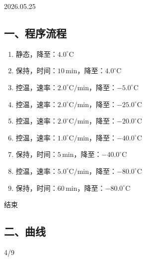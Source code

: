 \documentclass[UTF8,10pt,a4paper,fontset=fandol]{ctexart}
\newcommand{\handwritten}[1]{#1}
\begin{document}
\handwritten{2026.05.25}

\subsection*{一、程序流程}

\begin{enumerate}
    \item 静态，降至：$4.0^\circ\mathrm{C}$
    \item 保持，时间：$10\,\mathrm{min}$，降至：$4.0^\circ\mathrm{C}$
    \item 控温，速率：$2.0^\circ\mathrm{C}/\mathrm{min}$，降至：$-5.0^\circ\mathrm{C}$
    \item 控温，速率：$2.0^\circ\mathrm{C}/\mathrm{min}$，降至：$-25.0^\circ\mathrm{C}$
    \item 控温，速率：$2.0^\circ\mathrm{C}/\mathrm{min}$，降至：$-20.0^\circ\mathrm{C}$
    \item 控温，速率：$1.0^\circ\mathrm{C}/\mathrm{min}$，降至：$-40.0^\circ\mathrm{C}$
    \item 保持，时间：$5\,\mathrm{min}$，降至：$-40.0^\circ\mathrm{C}$
    \item 控温，速率：$5.0^\circ\mathrm{C}/\mathrm{min}$，降至：$-80.0^\circ\mathrm{C}$
    \item 保持，时间：$60\,\mathrm{min}$，降至：$-80.0^\circ\mathrm{C}$
\end{enumerate}

结束

\subsection*{二、曲线}

\begin{figure}[h]
    \centering
\end{figure}

\hfill\handwritten{4/9}

\newpage
\end{document}
